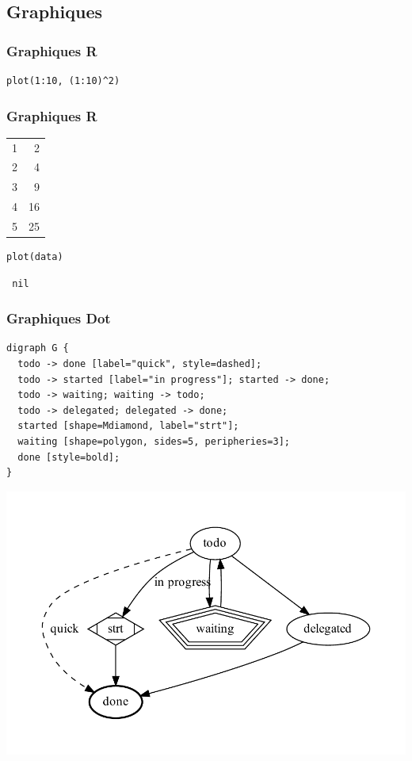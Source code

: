 \documentclass[presentation,t,hideothersubsections]{beamer}
\begin{document}
\subsection{Graphiques}
\label{sec-3-5}
\begin{frame}[fragile]
\frametitle{Graphiques R}
\label{sec-3-5-1}



\lstset{language=R}
\begin{lstlisting}
plot(1:10, (1:10)^2)
\end{lstlisting}
\end{frame}
\begin{frame}[fragile]
\frametitle{Graphiques R}
\label{sec-3-5-2}



\begin{center}
\begin{tabular}{rr}
 1  &   2  \\
 2  &   4  \\
 3  &   9  \\
 4  &  16  \\
 5  &  25  \\
\end{tabular}
\end{center}




\lstset{language=R}
\begin{lstlisting}
plot(data)
\end{lstlisting}



\begin{verbatim}
 nil
\end{verbatim}
\end{frame}
\begin{frame}
\frametitle{Graphiques Dot}
\label{sec-3-5-3}



\lstset{language=dot}
\begin{lstlisting}
digraph G {
  todo -> done [label="quick", style=dashed];
  todo -> started [label="in progress"]; started -> done;
  todo -> waiting; waiting -> todo;
  todo -> delegated; delegated -> done;
  started [shape=Mdiamond, label="strt"];
  waiting [shape=polygon, sides=5, peripheries=3];
  done [style=bold];
}
\end{lstlisting}

\includegraphics[width=.8\linewidth]{foo.pdf}
\end{frame}
\end{document}
